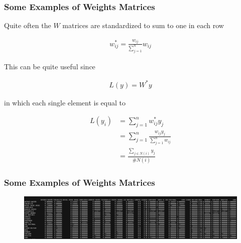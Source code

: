\documentclass[
  shownotes,
  xcolor={svgnames},
  hyperref={colorlinks,citecolor=DarkBlue,linkcolor=DarkRed,urlcolor=DarkBlue}
  ]{beamer}
\begin{document}
\begin{frame}[fragile]
\frametitle{Some Examples of Weights Matrices}
Quite often the $W$ matrices are standardized to sum to one in each row

\begin{align}
w^*_{ij}=\frac{w_{ij}}{\sum_{j=1}^n}w_{ij}
\end{align}

This can be quite useful since

\begin{align}
L(y) =W^{*} y
\end{align}

in which each single element is equal to

\begin{align}
L(y_i) &= \sum_{j=1}^n w^*_{ij}y_j \\ \nonumber
&= \sum_{j=1}^n \frac{w_{ij}y_j}{\sum_{j=1}^n w_{ij}}  \\
&= \frac{\sum_{j\in N(i)}y_j}{\# N(i)}
\end{align}
\end{frame}
\begin{frame}[fragile]
\frametitle{Some Examples of Weights Matrices}

  \begin{figure}[H] \centering
    \captionsetup{justification=centering}
    \includegraphics[scale=0.45]{figures/matrix_loc_row_stand}
   \end{figure}

\end{frame}
\end{document}
